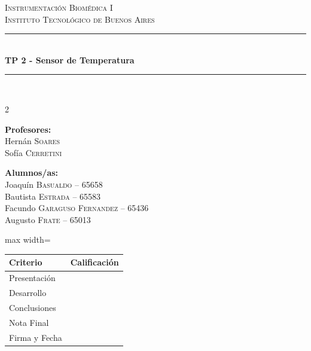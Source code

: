 \documentclass[10pt]{article}
\newcommand{\materia}{Instrumentación Biomédica I}
\newcommand{\institucion}{Instituto Tecnológico de Buenos Aires}
\newcommand{\numeroTP}{2}
\newcommand{\nombreTP}{Sensor de Temperatura}
\newcommand{\HRule}{\rule{\linewidth}{0.5mm}}
\begin{document}
\begin{center}

\textsc{\LARGE \materia}\\[0.2cm]
\textsc{\Large \institucion}\\[0.2cm]

\HRule \\[0.2cm]
{\huge\bfseries TP \numeroTP{} - \nombreTP \\[0.2cm]}
\HRule \\[1cm]

\begin{multicols}{2}

\begin{flushleft}
    \large
    \textbf{Profesores:}\\
    Hernán \textsc{Soares}\\
    Sofía \textsc{Cerretini}
\end{flushleft}

\columnbreak

\begin{flushleft}
    \large
    \textbf{Alumnos/as:}\\
    Joaquín \textsc{Basualdo} -- 65658\\
    Bautista \textsc{Estrada} -- 65583\\
    Facundo \textsc{Garaguso Fernandez} -- 65436\\
    Augusto \textsc{Frate} -- 65013
\end{flushleft}

\end{multicols}

\vspace{0.5cm}

\renewcommand{\arraystretch}{1.6}

\begin{adjustbox}{max width=\textwidth}
\begin{tabular}{|p{6cm}|p{7cm}|}
\hline
\textbf{Criterio} & \textbf{Calificación} \\ \hline
Presentación & \\ \hline
Desarrollo & \\ \hline
Conclusiones & \\ \hline
Nota Final & \\ \hline\hline
Firma y Fecha & \\ \hline
\end{tabular}
\end{adjustbox}

\end{center}
\end{document}
